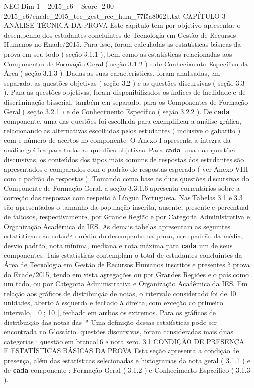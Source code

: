 \begin{textsample}{NEG Dim 1 – 2015\_c6 – Score -2.00 – 2015\_c6/enade\_2015\_tec\_gest\_rec\_hum\_77f5a8062b.txt}  \label{ex:f1_neg_282}
CAPÍTULO 3 ANÁLISE TÉCNICA DA PROVA Este capítulo tem por objetivo apresentar o desempenho dos estudantes concluintes de Tecnologia em Gestão de Recursos Humanos no Enade/2015.
Para isso, foram calculadas as estatísticas básicas da prova em seu todo ( seção 3.1.1 ), bem como as estatísticas relacionadas aos Componentes de Formação Geral ( seção 3.1.2 ) e de Conhecimento Específico da Área ( seção 3.1.3 ).
Dadas as suas características, foram analisadas, em separado, as questões objetivas ( seção 3.2 ) e as questões discursivas ( seção 3.3 ).
Para as questões objetivas, foram disponibilizados os índices de facilidade e de discriminação bisserial, também em separado, para os Componentes de Formação Geral ( seção 3.2.1 ) e de Conhecimento Específico ( seção 3.2.2 ).
De \textbf{cada} componente, uma das questões foi escolhida para exemplificar a análise gráfica, relacionando as alternativas escolhidas pelos estudantes ( inclusive o gabarito ) com o número de acertos no componente.
O Anexo I apresenta a íntegra da análise gráfica para todas as questões objetivas.
Para \textbf{cada} uma das questões discursivas, os conteúdos dos tipos mais comuns de respostas dos estudantes são apresentados e comparados com o padrão de respostas esperado ( ver Anexo VIII com o padrão de respostas ).
Tomando como base as duas questões discursivas do Componente de Formação Geral, a seção 3.3.1.6 apresenta comentários sobre a correção das respostas com respeito à Língua Portuguesa.
Nas Tabelas 3.1 e 3.3 são apresentados o tamanho da população inscrita, ausente, presente e percentual de faltosos, respectivamente, por Grande Região e por Categoria Administrativa e Organização Acadêmica da IES.
As demais tabelas apresentam as seguintes estatísticas das notas¹⁵ : média do desempenho na prova, erro padrão da média, desvio padrão, nota mínima, mediana e nota máxima para \textbf{cada} um de seus componentes.
Tais estatísticas contemplam o total de estudantes concluintes da Área de Tecnologia em Gestão de Recursos Humanos inscritos e presentes à prova do Enade/2015, tendo em vista agregações ou por Grandes Regiões e o país como um todo, ou por Categoria Administrativa e Organização Acadêmica da IES.
Em relação aos gráficos de distribuição de notas, o intervalo considerado foi de 10 unidades, aberto à esquerda e fechado à direita, com exceção do primeiro intervalo, [ 0 ; 10 ], fechado em ambos os extremos.
Para os gráficos de distribuição das notas das ¹⁵ Uma definição dessas estatísticas pode ser encontrada no Glossário. questões discursivas, foram consideradas mais duas categorias : questão em branco16 e nota zero. 3.1 CONDIÇÃO DE PRESENÇA E ESTATÍSTICAS BÁSICAS DA PROVA Esta seção apresenta a condição de presença, além das estatísticas selecionadas e histogramas da nota geral ( 3.1.1 ) e de \textbf{cada} componente : Formação Geral ( 3.1.2 ) e Conhecimento Específico ( 3.1.3 ).

\end{textsample}
